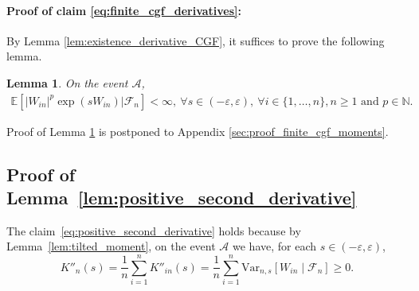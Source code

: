 \documentclass[12pt]{article}
\newtheorem{lemma}{Lemma}
\theoremstyle{definition}
\newcommand{\E}{\mathbb E}								%
\newcommand{\V}{\mathrm{Var}}							%
\begin{document}
\paragraph{Proof of claim \eqref{eq:finite_cgf_derivatives}:}

By Lemma \ref{lem:existence_derivative_CGF}, it suffices to prove the following lemma.
\begin{lemma}\label{lem:finite_cgf_moments}
	On the event $\mathcal{A}$, 
	\begin{align*}
		\E[|W_{in}|^p\exp(sW_{in})|\mathcal{F}_n]<\infty,\ \forall s\in (-\varepsilon,\varepsilon),\ \forall i\in\{1,\ldots,n\}, n\geq 1\text{ and } p\in \mathbb{N}.
	\end{align*}
\end{lemma}
\noindent Proof of Lemma \ref{lem:finite_cgf_moments} is postponed to Appendix \ref{sec:proof_finite_cgf_moments}.


\subsection{Proof of Lemma~\ref{lem:positive_second_derivative}}

The claim~\eqref{eq:positive_second_derivative} holds because by Lemma~\ref{lem:tilted_moment}, on the event $\mathcal A$ we have, for each $s \in (-\varepsilon, \varepsilon)$,
\begin{equation*}
K''_n(s) = \frac{1}{n}\sum_{i = 1}^n K''_{in}(s) = \frac{1}{n}\sum_{i = 1}^n \V_{n, s}[W_{in} \mid \mathcal F_n] \geq 0.
\end{equation*}
\end{document}
